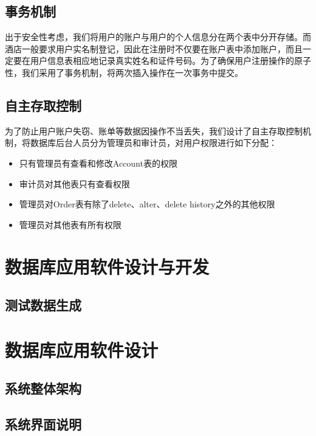 \documentclass{myreport}
\begin{document}
\section{事务机制}
出于安全性考虑，我们将用户的账户与用户的个人信息分在两个表中分开存储。而酒店一般要求用户实名制登记，因此在注册时不仅要在账户表中添加账户，而且一定要在用户信息表相应地记录真实姓名和证件号码。为了确保用户注册操作的原子性，我们采用了事务机制，将两次插入操作在一次事务中提交。

\section{自主存取控制}
为了防止用户账户失窃、账单等数据因操作不当丢失，我们设计了自主存取控制机制，将数据库后台人员分为管理员和审计员，对用户权限进行如下分配： 
\begin{itemize}
    \item 只有管理员有查看和修改Account表的权限
    \item 审计员对其他表只有查看权限
    \item 管理员对Order表有除了delete、alter、delete history之外的其他权限
    \item 管理员对其他表有所有权限
\end{itemize}

\chapter{数据库应用软件设计与开发}
\section{测试数据生成}


\chapter{数据库应用软件设计}

\section{系统整体架构}


\section{系统界面说明}
\end{document}
